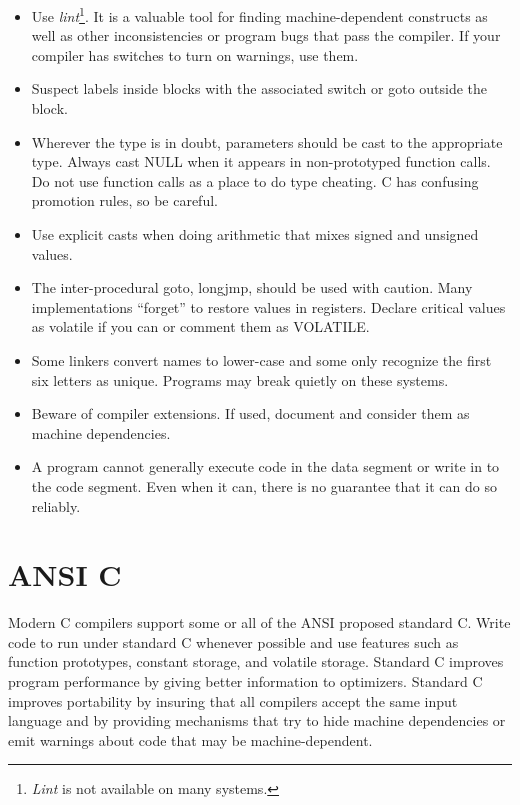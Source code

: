 \begin{itemize}
\item Use {\em lint}\/\footnote{{\em Lint} is not available on many systems.}.
It is a valuable tool for finding machine-dependent constructs as well as other
inconsistencies or program bugs that pass the compiler. If your compiler has
switches to turn on warnings, use them. 

\item Suspect labels inside blocks with the associated switch or goto outside
the block.

\item Wherever the type is in doubt, parameters should be cast to the
appropriate type. Always cast NULL when it appears in non-prototyped function
calls. Do not use function calls as a place to do type cheating. C has
confusing promotion rules, so be careful.

\item Use explicit casts when doing arithmetic that mixes signed and unsigned
values.

\item The inter-procedural goto, longjmp, should be used with caution. Many
implementations ``forget'' to restore values in registers. Declare critical
values as volatile if you can or comment them as VOLATILE.

\item Some linkers convert names to lower-case and some only recognize the first
six letters as unique. Programs may break quietly on these systems.

\item Beware of compiler extensions. If used, document and consider them as
machine dependencies. 

\item A program cannot generally execute code in the data segment or write in
to the code segment. Even when it can, there is no guarantee that it can do so
reliably. 
\end{itemize}
\newpage
\section{ANSI C}

 Modern C compilers support some or all of the ANSI proposed standard C. Write
code to run under standard C whenever possible and use features such as
function prototypes, constant storage, and volatile storage. Standard C
improves program performance by giving better information to optimizers.
Standard C improves portability by insuring that all compilers accept the same
input language and by providing mechanisms that try to hide machine
dependencies or emit warnings about code that may be machine-dependent.

